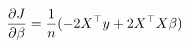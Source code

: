 \documentclass[preview]{standalone}
\begin{document}
\begin{align*}
\special{dvisvgm:raw <g id='unique000'>}\frac{\partial J}{\partial \beta} = \frac{1}{n}(-2X^\top y + 2X^\top X\beta)\special{dvisvgm:raw </g>}
\end{align*}
\end{document}
